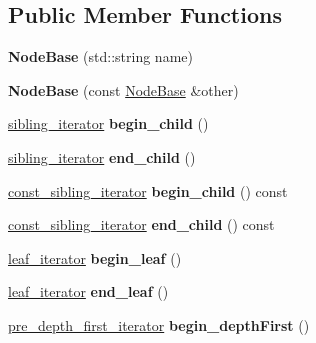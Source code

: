 \subsection*{Public Member Functions}
\begin{DoxyCompactItemize}
\item 
\mbox{\label{classNodeBase_aeb1a1b1f99a5ff3ea1912de6514b2b3f}} 
{\bfseries Node\+Base} (std\+::string name)
\item 
\mbox{\label{classNodeBase_a8c215a5a318c25a1f80d351abc1480a8}} 
{\bfseries Node\+Base} (const \mbox{\hyperlink{classNodeBase}{Node\+Base}} \&other)
\item 
\mbox{\label{classNodeBase_a9b029177f8e623c4052b380b30412b22}} 
\mbox{\hyperlink{classSiblingIterator}{sibling\+\_\+iterator}} {\bfseries begin\+\_\+child} ()
\item 
\mbox{\label{classNodeBase_a35010478142604ccd34de94c15187b63}} 
\mbox{\hyperlink{classSiblingIterator}{sibling\+\_\+iterator}} {\bfseries end\+\_\+child} ()
\item 
\mbox{\label{classNodeBase_aa0df2f5101127ad21a6d1b0bc22ea33d}} 
\mbox{\hyperlink{classSiblingIterator}{const\+\_\+sibling\+\_\+iterator}} {\bfseries begin\+\_\+child} () const
\item 
\mbox{\label{classNodeBase_a94577b22d1164a70bc03bf11e22e8b53}} 
\mbox{\hyperlink{classSiblingIterator}{const\+\_\+sibling\+\_\+iterator}} {\bfseries end\+\_\+child} () const
\item 
\mbox{\label{classNodeBase_a0151d1788db2d1b297748124c2f313a7}} 
\mbox{\hyperlink{classLeafNodeIterator}{leaf\+\_\+iterator}} {\bfseries begin\+\_\+leaf} ()
\item 
\mbox{\label{classNodeBase_a2d998bed50e569ed13976677a2c9149c}} 
\mbox{\hyperlink{classLeafNodeIterator}{leaf\+\_\+iterator}} {\bfseries end\+\_\+leaf} ()
\item 
\mbox{\label{classNodeBase_a27080a38ec75bea02d07f66922b73da6}} 
\mbox{\hyperlink{classDepthFirstIterator}{pre\+\_\+depth\+\_\+first\+\_\+iterator}} {\bfseries begin\+\_\+depth\+First} ()

\end{DoxyCompactItemize}
